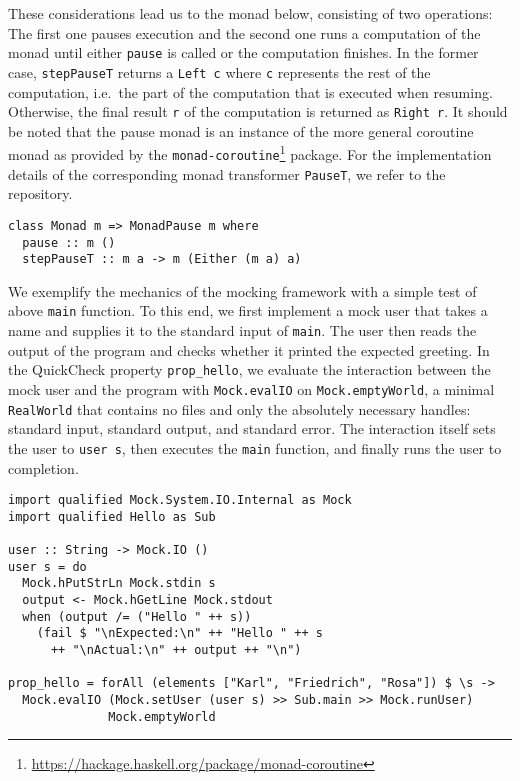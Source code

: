 These considerations lead us to the monad below,
consisting of two operations:
The first one pauses execution and the second one runs a computation of the monad until either \texttt{pause} is called or the computation finishes.
In the former case,
\texttt{stepPauseT} returns a \texttt{Left c} where \texttt{c} represents the rest of the computation, i.e.\ the part of the computation that is executed when resuming.
Otherwise, the final result \texttt{r} of the computation is returned as \texttt{Right r}.
It should be noted that the pause monad is an instance of the more general coroutine monad as provided by the \texttt{monad-coroutine}\footnote{\url{https://hackage.haskell.org/package/monad-coroutine}} package.
For the implementation details of the corresponding monad transformer \texttt{PauseT}, we refer to the repository.
\begin{verbatim}
class Monad m => MonadPause m where
  pause :: m ()
  stepPauseT :: m a -> m (Either (m a) a)
\end{verbatim}
We exemplify the mechanics of the mocking framework with a simple test of above \texttt{main} function.
To this end, we first implement a mock user that takes a name and supplies it to the standard input of \texttt{main}.
The user then reads the output of the program and checks whether it printed the expected greeting.
In the QuickCheck property \texttt{prop_hello},
we evaluate the interaction between the mock user and the program with \texttt{Mock.evalIO} on \texttt{Mock.emptyWorld}, a minimal \texttt{RealWorld} that contains no files and only the absolutely necessary handles: standard input, standard output, and standard error.
The interaction itself sets the user to \texttt{user s},
then executes the \texttt{main} function, and finally runs the user to completion.
\begin{verbatim}
import qualified Mock.System.IO.Internal as Mock
import qualified Hello as Sub

user :: String -> Mock.IO ()
user s = do
  Mock.hPutStrLn Mock.stdin s
  output <- Mock.hGetLine Mock.stdout
  when (output /= ("Hello " ++ s))
    (fail $ "\nExpected:\n" ++ "Hello " ++ s
      ++ "\nActual:\n" ++ output ++ "\n")

prop_hello = forAll (elements ["Karl", "Friedrich", "Rosa"]) $ \s ->
  Mock.evalIO (Mock.setUser (user s) >> Sub.main >> Mock.runUser)
              Mock.emptyWorld
\end{verbatim}

